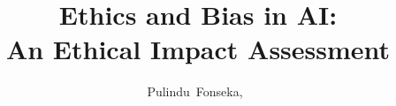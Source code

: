 \documentclass[10pt,journal,compsoc]{IEEEtran}
\begin{document}
%
\title{Ethics and Bias in AI:\\ An Ethical Impact Assessment}
%
%
%
%

\author{Pulindu~Fonseka,~


}

% 
%
\end{document}
